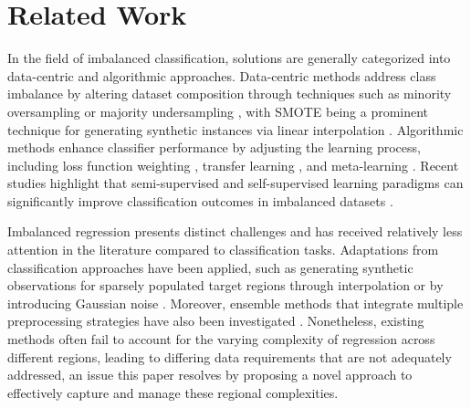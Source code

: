 \section{Related Work}
In the field of imbalanced classification, solutions are generally categorized into data-centric and algorithmic approaches. Data-centric methods address class imbalance by altering dataset composition through techniques such as minority oversampling or majority undersampling \cite{chawla_smote_2011,he_adasyn_2008}, with SMOTE being a prominent technique for generating synthetic instances via linear interpolation \cite{chawla_smote_2011,zhang_mixup_2018,verma_manifold_2019}. Algorithmic methods enhance classifier performance by adjusting the learning process, including loss function weighting \cite{cao_learning_2019,cui_class-balanced_2019}, transfer learning \cite{singh_imbalanced_2021}, and meta-learning \cite{shu_meta-weight-net_2019}. Recent studies highlight that semi-supervised and self-supervised learning paradigms can significantly improve classification outcomes in imbalanced datasets \cite{yang_rethinking_2020}.

Imbalanced regression presents distinct challenges and has received relatively less attention in the literature compared to classification tasks. Adaptations from classification approaches have been applied, such as generating synthetic observations for sparsely populated target regions through interpolation \cite{camacho_wsmoter_2024} or by introducing Gaussian noise \cite{branco_smogn_2017}. Moreover, ensemble methods that integrate multiple preprocessing strategies have also been investigated \cite{branco_rebagg_2018}. Nonetheless, existing methods often fail to account for the varying complexity of regression across different regions, leading to differing data requirements that are not adequately addressed, an issue this paper resolves by proposing a novel approach to effectively capture and manage these regional complexities.